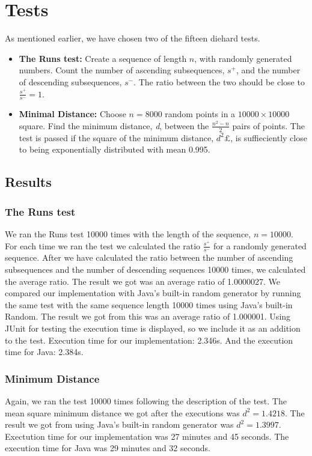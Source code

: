 \section{Tests}
As mentioned earlier, we have chosen two of the fifteen diehard tests. 
\begin{itemize}
\item \textbf{The Runs test: }Create a sequence of length $n$, with randomly generated numbers. Count the number of ascending subsequences, $s^+$, and the number of descending subsequences, $s^-$. The ratio between the two should be close to $\frac{s^+}{s^-} = 1$.

\item \textbf{Minimal Distance: }Choose $n = 8000$ random points in a $10000 \times 10000$ square. Find the minimum distance, \textit{d}, between the $\frac{n^2 -n}{2}$ pairs of points. The test is passed if the square of the minimum distance, $d^2£$, is suffieciently close to being exponentially distributed with mean 0.995. 
\end{itemize}

\subsection{Results}
\subsubsection{The Runs test}
We ran the Runs test 10000 times with the length of the sequence, $n = 10000$. For each time we ran the test we calculated the ratio $\frac{s^+}{s^-}$ for a randomly generated sequence. After we have calculated the ratio between the number of ascending subsequences and the number of descending sequences 10000 times, we calculated the average ratio. The result we got was an average ratio of 1.0000027. We compared our implementation with Java's built-in random generator by running the same test with the same sequence length 10000 times using Java's built-in Random. The result we got from this was an average ratio of 1.000001. Using JUnit for testing the execution time is displayed, so we include it as an addition to the test. Execution time for our implementation: 2.346s. And the execution time for Java: 2.384s.

\subsubsection{Minimum Distance}
Again, we ran the test 10000 times following the description of the test\cite{jdiehard}. The mean square minimum distance we got after the executions was $d^2 = 1.4218$. The result we got from using Java's built-in random generator was $d^2 = 1.3997$. Exectution time for our implementation was 27 minutes and 45 seconds. The execution time for Java was 29 minutes and 32 seconds.

